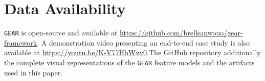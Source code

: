 \documentclass[manuscript,screen,review]{acmart}
\begin{document}



\maketitle
\glsresetall




% 



\section*{Data Availability}
\label{data}
\texttt{GEAR} is open-source and available at \url{https://github.com/brellsanwouo/gear-framework}. 
A demonstration video presenting an end-to-end case study is also available at \url{https://youtu.be/K-V77HbWxv0}.The GitHub repository additionally   the complete visual representations of the \texttt{GEAR} feature models and the artifacts used in this paper.
\clearpage



\clearpage


\end{document}
